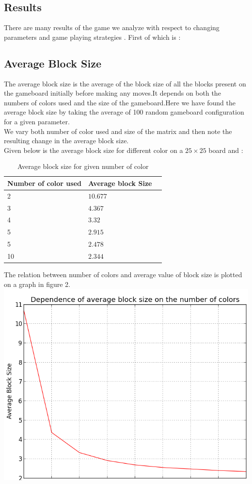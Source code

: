 \documentclass[twoside]{article}
\begin{document}
\begin{multicols}{2}
\section{Results}
There are many results of the game we analyze with respect to changing parameters and game playing strategies . First of which is :
\subsection{Average Block Size}
The average block size is the average of the block size of all the blocks present on the gameboard initially before making any moves.It  depends on both the numbers of colors used and the size of the gameboard.Here we have found the average block size by taking the average of 100 random gameboard configuration for a given parameter.\\
We vary both number of color used and size of the matrix and then note the resulting change in the average block size.\\
Given below is the average block size for different  color on a $25\times25 $ board and :
\begin{table}[H]
\caption{Average block size for given number of color}
\centering
\begin{tabular}{llr}
\toprule
\cmidrule(r){1-2}
Number of color used & Average block Size \\
\midrule
 2 & $ 10.677 $ \\
 3 & $ 4.367 $ \\
 4 & $ 3.32 $ \\
 5 & $ 2.915 $ \\
 5 & $ 2.478 $ \\
 10 & $ 2.344 $ \\
\bottomrule
\end{tabular}
\end{table}
The relation between number of colors and average value of block size is plotted on a graph in figure 2.
\includegraphics[scale=0.4]{colorblock}

\end{multicols}
\end{document}
